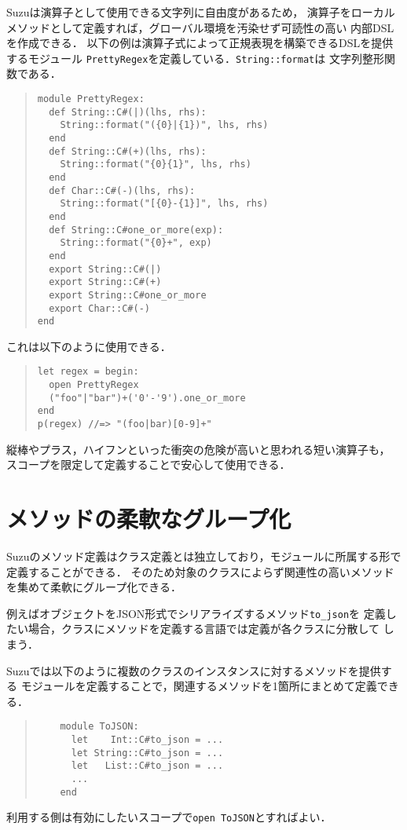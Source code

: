\documentclass[a4paper,11pt,dvipdfmx]{jreport}
\begin{document}
Suzuは演算子として使用できる文字列に自由度があるため，
演算子をローカルメソッドとして定義すれば，グローバル環境を汚染せず可読性の高い
内部DSLを作成できる．
以下の例は演算子式によって正規表現を構築できるDSLを提供するモジュール
\verb|PrettyRegex|を定義している．\verb|String::format|は
文字列整形関数である．
\begin{quote}
\begin{verbatim}
module PrettyRegex:
  def String::C#(|)(lhs, rhs):
    String::format("({0}|{1})", lhs, rhs)
  end
  def String::C#(+)(lhs, rhs):
    String::format("{0}{1}", lhs, rhs)
  end
  def Char::C#(-)(lhs, rhs):
    String::format("[{0}-{1}]", lhs, rhs)
  end
  def String::C#one_or_more(exp):
    String::format("{0}+", exp)
  end
  export String::C#(|)
  export String::C#(+)
  export String::C#one_or_more
  export Char::C#(-)
end
\end{verbatim}
\end{quote}
これは以下のように使用できる．
\begin{quote}
\begin{verbatim}
let regex = begin:
  open PrettyRegex
  ("foo"|"bar")+('0'-'9').one_or_more
end
p(regex) //=> "(foo|bar)[0-9]+"
\end{verbatim}
\end{quote}
縦棒やプラス，ハイフンといった衝突の危険が高いと思われる短い演算子も，
スコープを限定して定義することで安心して使用できる．


\section{メソッドの柔軟なグループ化}
\label{section:grouping}

Suzuのメソッド定義はクラス定義とは独立しており，モジュールに所属する形で
定義することができる．
そのため対象のクラスによらず関連性の高いメソッドを集めて柔軟にグループ化できる．

例えばオブジェクトをJSON形式でシリアライズするメソッド\verb|to_json|を
定義したい場合，クラスにメソッドを定義する言語では定義が各クラスに分散して
しまう．

Suzuでは以下のように複数のクラスのインスタンスに対するメソッドを提供する
モジュールを定義することで，関連するメソッドを1箇所にまとめて定義できる．
\begin{quote}
	\begin{verbatim}
	module ToJSON:
	  let    Int::C#to_json = ...
	  let String::C#to_json = ...
	  let   List::C#to_json = ...
	  ...
	end
	\end{verbatim}
\end{quote}
利用する側は有効にしたいスコープで\verb|open ToJSON|とすればよい．
\end{document}
